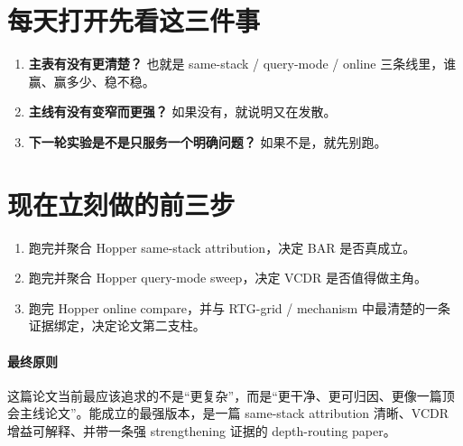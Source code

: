 \documentclass[11pt,UTF8,fontset=fandol]{ctexart}
\begin{document}
\section{每天打开先看这三件事}

\begin{enumerate}
  \item \textbf{主表有没有更清楚？} 也就是 same-stack / query-mode / online 三条线里，谁赢、赢多少、稳不稳。
  \item \textbf{主线有没有变窄而更强？} 如果没有，就说明又在发散。
  \item \textbf{下一轮实验是不是只服务一个明确问题？} 如果不是，就先别跑。
\end{enumerate}

\section{现在立刻做的前三步}

\begin{enumerate}
  \item 跑完并聚合 Hopper same-stack attribution，决定 BAR 是否真成立。
  \item 跑完并聚合 Hopper query-mode sweep，决定 VCDR 是否值得做主角。
  \item 跑完 Hopper online compare，并与 RTG-grid / mechanism 中最清楚的一条证据绑定，决定论文第二支柱。
\end{enumerate}

\paragraph{最终原则}
这篇论文当前最应该追求的不是“更复杂”，而是“更干净、更可归因、更像一篇顶会主线论文”。能成立的最强版本，是一篇 same-stack attribution 清晰、VCDR 增益可解释、并带一条强 strengthening 证据的 depth-routing paper。
\end{document}
